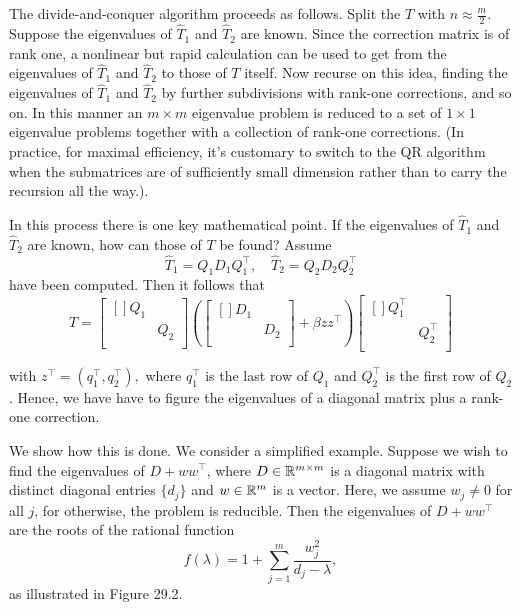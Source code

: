 The divide-and-conquer algorithm proceeds as follows. Split the $T$ with $n\approx \frac{m}{2}$. Suppose the eigenvalues of $ \hat T_1 $ and $ \hat T_2 $ are known. Since the correction  matrix is of rank one, a nonlinear but rapid calculation can be used to get from the eigenvalues of $ \hat T_1 $ and $ \hat T_2 $ to those of $ T $ itself. Now recurse on this idea, finding the eigenvalues of $ \hat T_1 $ and $ \hat T_2 $ by further subdivisions with rank-one corrections, and so on. In this manner an $ m \times  m $ eigenvalue problem is reduced to a set of $ 1\times 1 $ eigenvalue problems together with a collection of rank-one corrections. (In practice, for maximal efficiency, it's customary to switch to the QR algorithm when the submatrices are of sufficiently small dimension rather than to carry the recursion all the way.). 

In this process there is one key mathematical point. If the eigenvalues of $ \hat T_1 $ and $ \hat T_2 $ are known, how can those of $ T$ be found? Assume 
\[
    \hat T_1 = Q_1 D_1 Q_1^\top , \quad \hat T_2 = Q_2 D_2 Q_2^\top  
\]
have been computed. Then it follows that 
\begin{equation}
\label{eq: conquer step }
        T = \begin{bmatrix}[] 
        Q_1 &   \\
         &  Q_2 \\
    \end{bmatrix} \left( \begin{bmatrix}[] 
        D_1 &   \\
         &  D_2 \\
    \end{bmatrix} + \beta zz^\top    \right) \begin{bmatrix}[] 
        Q_1^\top  &   \\
         &  Q_2^\top  \\
    \end{bmatrix}  
\end{equation}

with $ z^\top  = ( q_1^\top ,q_2^\top  ) ,$ where $ q_1^\top  $ is the last row of $ Q_1 $ and $ Q_2^\top  $ is the first row of $ Q_2 $.  Hence, we have have to figure the eigenvalues of a diagonal matrix plus a rank-one correction.  

We show how this is done. We consider a simplified example. Suppose we wish to find the eigenvalues of $ D + ww^\top  $, where $ D\in \mathbb{R}^{m\times m} $ is a diagonal matrix with distinct diagonal entries $ \{d_j\}  $ and $ w\in\mathbb{R}^{m} $ is a vector. Here, we assume $ w_j\neq 0 $ for all $ j $, for otherwise, the problem is reducible. Then the eigenvalues of $ D+ww^\top  $ are the roots of the rational function
\[
    f(\lambda ) = 1+ \sum_{j=1}^{m} \frac{w_j^{2} }{d_j-\lambda },
\]
as illustrated in Figure 29.2. 


